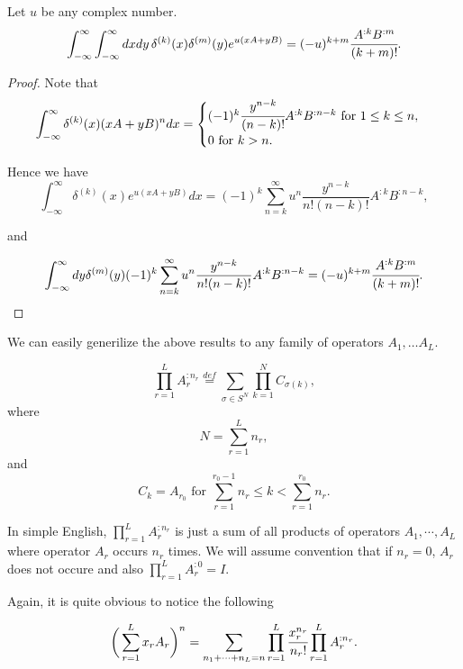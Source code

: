 \documentclass[main.tex]{subfiles}
\begin{document}
\begin{lemma} Let $u$ be any complex number.
\begin{equation}
\int_{-\infty}^{\infty} \int_{-\infty}^{\infty} dx dy\, \delta^{(k)}(x) \delta^{(m)}(y) e^{u(xA + yB)} = (-u)^{k + m}\cfrac{A^{:k}B^{:m}}{(k + m)!}.
\end{equation}
\end{lemma}
\begin{proof}
Note that 
\begin{equation}
\int_{-\infty}^{\infty} \delta^{(k)}(x) (xA + yB)^n dx 
= 
\begin{cases}
(-1)^k \cfrac{y^{n - k}}{(n - k)!} A^{:k}B^{:n-k} \text{ for } 1 \leq k \leq n,\\
0 \text{ for } k > n. 
\end{cases}
\end{equation}

Hence we have
\begin{equation}
\int_{-\infty}^{\infty} \delta^{(k)}(x) e^{u(xA + yB)}dx =
(-1)^k \sum_{n = k}^\infty u^n \frac{y^{n - k}}{n!(n-k)!} A^{:k}B^{:n-k},
\end{equation}

and

\begin{equation}
\int_{-\infty}^\infty dy \delta^{(m)}(y) (-1)^k \sum_{n = k}^\infty u^n \frac{y^{n - k}}{n!(n-k)!} A^{:k}B^{:n-k} = (-u)^{k + m}\cfrac{A^{:k}B^{:m}}{(k + m)!}.
\end{equation}
\end{proof}

We can easily generilize the above results to any family of operators $A_1, \dots A_L$.

\begin{definition}
\begin{equation}
\prod_{r=1}^L A_r^{:n_r} \stackrel{def}{=} \sum_{\sigma\in S^{N}} \prod_{k = 1}^{N} C_{\sigma(k)},
\end{equation}
where
$$N = \sum_{r=1}^L n_r,$$
and
$$C_k = A_{r_0} \text{ for } \sum_{r=1}^{r_0 - 1} n_r \leq k < \sum_{r=1}^{r_0} n_r.$$
\end{definition}

In simple English, $\prod_{r=1}^L A_r^{:n_r}$ is just a sum of all products of operators $A_1, \cdots, A_L$ where operator $A_r$ occurs $n_r$ times. We will assume convention that if $n_r = 0$, $A_r$ does not occure and also $\prod_{r=1}^L A_r^{:0} = I$.

Again, it is quite obvious to notice the following
\begin{lemma}
\begin{equation}
\bigg( \sum_{r=1}^L x_r A_r \bigg)^n = \sum_{n_1 + \cdots + n_L = n} \prod_{r=1}^L \cfrac{x_r^{n_r}}{n_r!} \prod_{r=1}^L A_r^{:n_r}.
\end{equation}
\end{lemma}
\end{document}
